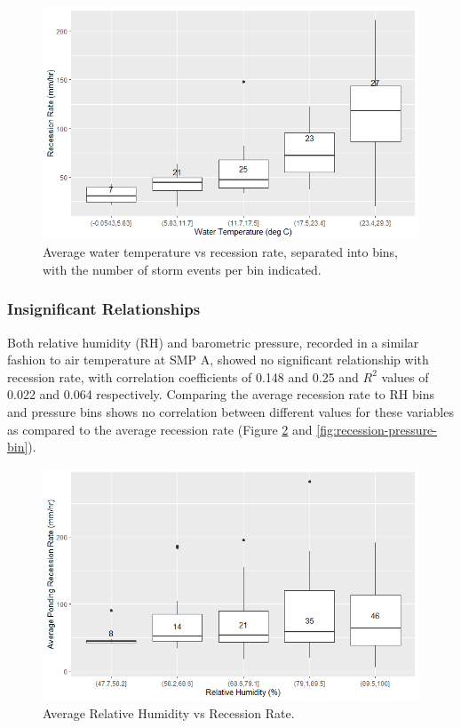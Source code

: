 \begin{figure}[ht]
	\centering
	\includegraphics[width=\textwidth]{gfx/chapter-data-analysis/temperature_vs_recession_rate_binned.png}
	\caption[Average water temperature vs recession rate.]{Average water temperature vs recession rate, separated into bins, with the number of storm events per bin indicated.}
	\label{fig:temp-vs-recession-binned}
\end{figure}

\subsubsection{Insignificant Relationships}
Both relative humidity (RH) and barometric pressure, recorded in a similar fashion to air temperature at SMP A, showed no significant relationship with recession rate, with correlation coefficients of 0.148 and 0.25 and $R^2$ values of 0.022 and 0.064 respectively.
Comparing the average recession rate to RH bins and pressure bins shows no correlation between different values for these variables as compared to the average recession rate (Figure \ref{fig:recession-rh-bin} and \ref{fig:recession-pressure-bin}).

\begin{figure}[ht]
	\centering
	\includegraphics[width=\textwidth]{gfx/chapter-data-analysis/rh_vs_recession_rate_binned.png}
	\caption{Average Relative Humidity vs Recession Rate.}
	\label{fig:recession-rh-bin}
\end{figure}

